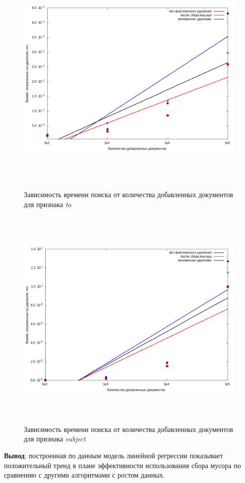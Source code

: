 \begin{figure}[H]
\includegraphics[width=\linewidth, height=11cm]{fig/to.png}
\caption{Зависимость времени поиска от количества добавленных документов для признака \textit{to}}
\includegraphics[width=\linewidth, height=11cm]{fig/subject.png}
\caption{Зависимость времени поиска от количества добавленных документов для признака \textit{subject}}
\end{figure}

\textbf{Вывод}: построенная по данным модель линейной регрессии показывает
положительный тренд в плане эффективности использования сбора мусора по сравнению
с другими алгоритмами с ростом данных.


